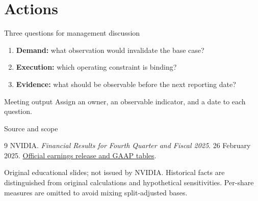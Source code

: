 \documentclass[11pt,aspectratio=169]{beamer}
\begin{document}
\section{Actions}
\begin{frame}{Three questions for management discussion}
\begin{enumerate}
\item \textbf{Demand:} what observation would invalidate the base case?
\item \textbf{Execution:} which operating constraint is binding?
\item \textbf{Evidence:} what should be observable before the next reporting date?
\end{enumerate}
\bigskip
\begin{block}{Meeting output}
Assign an owner, an observable indicator, and a date to each question.
\end{block}
\end{frame}
\appendix
\begin{frame}{Source and scope}
\small
\begin{thebibliography}{9}
 NVIDIA. \emph{Financial Results for Fourth Quarter and Fiscal 2025}. 26 February 2025.
\href{https://nvidianews.nvidia.com/news/nvidia-announces-financial-results-for-fourth-quarter-and-fiscal-2025}{Official earnings release and GAAP tables}.
\end{thebibliography}
\medskip
Original educational slides; not issued by NVIDIA. Historical facts are distinguished from original calculations and hypothetical sensitivities. Per-share measures are omitted to avoid mixing split-adjusted bases.
\end{frame}
\end{document}

